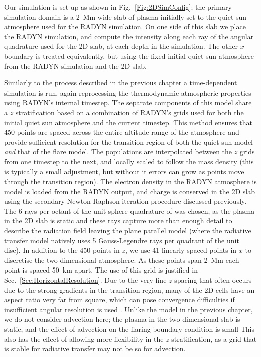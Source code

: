 Our simulation is set up as shown in Fig.~\ref{Fig:2DSimConfig}; the primary simulation domain is a \SI{2}{\mega\metre} wide slab of plasma initially set to the quiet sun atmosphere used for the RADYN simulation.
On one side of this slab we place the RADYN simulation, and compute the intensity along each ray of the angular quadrature used for the 2D slab, at each depth in the simulation.
The other $x$ boundary is treated equivalently, but using the fixed initial quiet sun atmosphere from the RADYN simulation and the 2D slab.

Similarly to the process described in the previous chapter a time-dependent simulation is run, again reprocessing the thermodynamic atmospheric properties using RADYN's internal timestep.
The separate components of this model share a $z$ stratification based on a combination of RADYN's grids used for both the initial quiet sun atmosphere and the current timestep.
This method ensures that 450 points are spaced across the entire altitude range of the atmosphere and provide sufficient resolution for the transition region of both the quiet sun model \emph{and} that of the flare model.
The populations are interpolated between the $z$ grids from one timestep to the next, and locally scaled to follow the mass density (this is typically a small adjustment, but without it errors can grow as points move through the transition region).
The electron density in the RADYN atmosphere is model is loaded from the RADYN output, and charge is conserved in the 2D slab using the secondary Newton-Raphson iteration procedure discussed previously.
The 6 rays per octant of the unit sphere quadrature of \citet{Stepan2020} was chosen, as the plasma in the 2D slab is static and these rays capture more than enough detail to describe the radiation field leaving the plane parallel model (where the radiative transfer model natively uses 5 Gauss-Legendre rays per quadrant of the unit disc).
In addition to the 450 points in $z$, we use 41 linearly spaced points in $x$ to discretise the two-dimensional atmosphere.
As these points span \SI{2}{\mega\metre} each point is spaced \SI{50}{\kilo\metre} apart.
The use of this grid is justified in Sec.~\ref{Sec:HorizontalResolution}.
Due to the very fine $z$ spacing that often occurs due to the strong gradients in the transition region, many of the 2D cells have an aspect ratio very far from square, which can pose convergence difficulties if insufficient angular resolution is used .
Unlike the model in the previous chapter, we do not consider advection here; the plasma in the two-dimensional slab is static, and the effect of advection on the flaring boundary condition is small
This also has the effect of allowing more flexibility in the $z$ stratification, as a grid that is stable for radiative transfer may not be so for advection.

